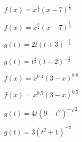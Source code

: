 \documentclass{ximera}
\begin{document}
\begin{question} $f(x) = x^{\frac{2}{3}}(x - 7)^{\frac{1}{3}}$
\end{question}
\begin{question} $f(x) = x^{\frac{3}{2}}(x - 7)^{\frac{1}{3}}$  
\end{question}
\begin{question} $g(t) = 2t(t+3)^{-\frac{1}{3}}$  
\end{question}
\begin{question} $g(t) = t^{\frac{3}{2}}(t-2)^{-\frac{1}{2}}$  
\end{question}
\begin{question} $f(x) = x^{0.4} (3-x)^{0.6}$  
\end{question}
\begin{question} $f(x) = x^{0.5} (3-x)^{0.5}$  
\end{question}
\begin{question} $g(t) = 4t (9-t^2)^{-\sqrt{2}}$  
\end{question}
\begin{question} $g(t) = 3(t^2+1)^{-\pi}$
\end{question}
\end{document}
